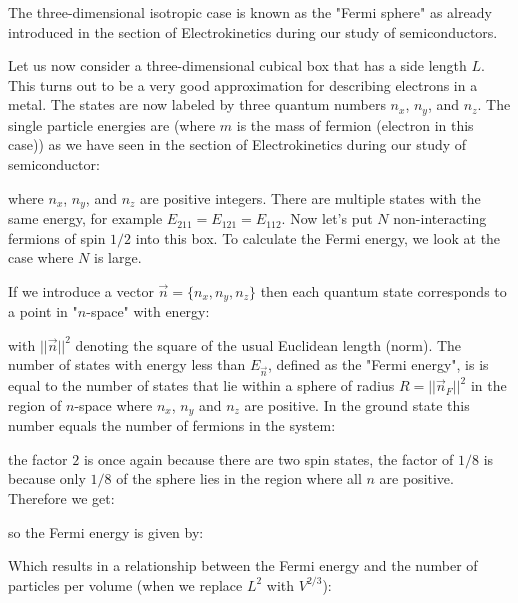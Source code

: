 	The three-dimensional isotropic case is known as the "Fermi sphere" as already introduced in the section of Electrokinetics during our study of semiconductors.
	
	Let us now consider a three-dimensional cubical box that has a side length $L$. This turns out to be a very good approximation for describing electrons in a metal. The states are now labeled by three quantum numbers $n_x$, $n_y$, and $n_z$. The single particle energies are (where $m$ is the mass of fermion (electron in this case)) as we have seen in the section of Electrokinetics during our study of semiconductor:
	
	where $n_x$, $n_y$, and $n_z$ are positive integers. There are multiple states with the same energy, for example $E_{211}=E_{121}=E_{112}$. Now let's put $N$ non-interacting fermions of spin $1/2$ into this box. To calculate the Fermi energy, we look at the case where $N$ is large.

	If we introduce a vector $\vec{n}=\{n_{x},n_{y},n_{z}\}$ then each quantum state corresponds to a point in "$n$-space" with energy:
	
	with $||\vec{n}||^2$  denoting the square of the usual Euclidean length (norm). The number of states with energy less than  $E_{\vec{n}}$, defined as the "Fermi energy", is  is equal to the number of states that lie within a sphere of radius $R=||\vec{n}_F||^2$ in the region of $n$-space where $n_x$, $n_y$ and $n_z$ are positive. In the ground state this number equals the number of fermions in the system:
	
	the factor $2$ is once again because there are two spin states, the factor of $1/8$ is because only $1/8$ of the sphere lies in the region where all $n$ are positive. Therefore we get:
	
	so the Fermi energy is given by:
	
	Which results in a relationship between the Fermi energy and the number of particles per volume (when we replace $L^2$ with $V^{2/3}$):
	
